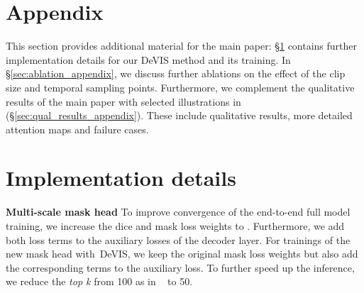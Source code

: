 \documentclass[runningheads]{llncs}
\newcommand{\evis}{\mbox{DeVIS}}
\begin{document}
 
\clearpage


\ifarxiv
    \appendix

    \def\suppabstract{This section provides additional material for the main paper:
\S\ref{sec:imp_details_appendix} contains further implementation details for our \evis{} method and its training. 
In \S\ref{sec:ablation_appendix}, we discuss further ablations on the effect of the clip size and temporal sampling points.
Furthermore, we complement the qualitative results of the main paper with selected illustrations in (\S\ref{sec:qual_results_appendix}).
These include qualitative results, more detailed attention maps and failure cases.
    }

    \section*{Appendix}
    \suppabstract
    
    \newcommand{\sref}[1]{Sec.~\ref{#1}}
    \setcounter{table}{0}
    \renewcommand{\thetable}{A.\arabic{table}}
    
    \setcounter{figure}{0}
    \renewcommand{\thefigure}{A.\arabic{figure}}
    
    





\section{Implementation details}

\label{sec:imp_details_appendix}

\noindent \textbf{Multi-scale mask head}
To improve convergence of the end-to-end full model training, we increase the dice and mask loss weights to .
Furthermore, we add both loss terms to the auxiliary losses of the  decoder layer.
For trainings of the new mask head with~\evis{}, we keep the original mask loss weights but also add the corresponding terms to the  auxiliary loss.
To further speed up the inference, we reduce the \textit{top k} from 100 as in ~\cite{deformable_detr} to 50.
\end{document}
